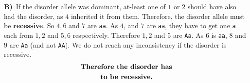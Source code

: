 \documentclass[12pt]{article}
\begin{document}
\par\noindent\textbf{B)\;\;\,} If the disorder allele was dominant, at-least one of $1$ or $2$ should have also had the disorder, as $4$ inherited it from them. Therefore, the disorder allele must be \textbf{recessive}. So $4,6$ and $7$ are \texttt{aa}. As $4$, and $7$ are \texttt{aa}, they have to get one \texttt{a} each from $1,2$ and $5,6$ respectively. Therefore $1,2$ and $5$ are \texttt{Aa}. As $6$ is \texttt{aa}, $8$ and $9$ are \texttt{Aa} (and not \texttt{AA}). We do not reach any inconsistency if the disorder is recessive.
\begin{align*}
    \textbf{Therefore the disorder has}\\
    \textbf{to be recessive.\hspace{1cm}}
\end{align*}\\\\\\

 
\end{document}

